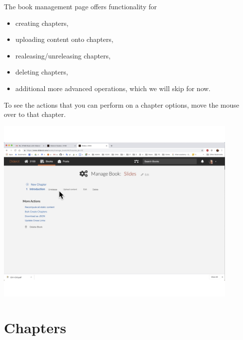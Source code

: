 \begin{gram}
The book management page offers functionality for
\begin{itemize}
\item creating chapters,
\item uploading content onto chapters,
\item realeasing/unreleasing chapters,
\item deleting chapters,
\item additional more advanced operations, which we will skip for now.
\end{itemize}

To see the actions that you can perform on a chapter options, move the mouse over to that chapter. 

\includegraphics[width=0.9\textwidth]{author/media/book-management.jpg}
\end{gram}

\section{Chapters}
\label{guide:chapter}

